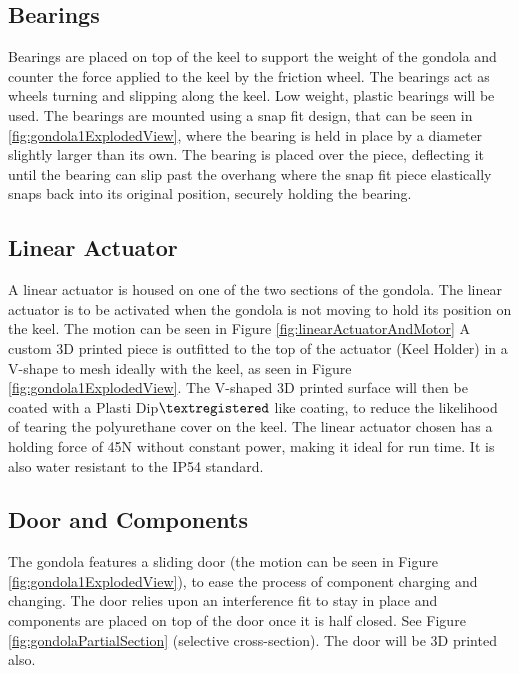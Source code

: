 \documentclass[../main.tex]{subfiles}
\begin{document}
\subsection{Bearings}
Bearings are placed on top of the keel to support the weight of the gondola and counter the force applied to the keel by the friction wheel. The bearings act as wheels turning and slipping along the keel. Low weight, plastic bearings will be used. The bearings are mounted using a snap fit design, that can be seen in \ref{fig:gondola1ExplodedView}, where the bearing is held in place by a diameter slightly larger than its own. The bearing is placed over the piece, deflecting it until the bearing can slip past the overhang where the snap fit piece elastically snaps back into its original position, securely holding the bearing.
\\
\subsection{Linear Actuator}
A linear actuator is housed on one of the two sections of the gondola. The linear actuator is to be activated when the gondola is not moving to hold its position on the keel. The motion can be seen in Figure \ref{fig:linearActuatorAndMotor} A custom 3D printed piece is outfitted to the top of the actuator (Keel Holder) in a V-shape to mesh ideally with the keel, as seen in Figure \ref{fig:gondola1ExplodedView}. The V-shaped 3D printed surface will then be coated with a Plasti Dip${\textregistered}$ like coating, to reduce the likelihood of tearing the polyurethane cover on the keel.  The  linear actuator chosen has a holding force of 45N without constant power, making it ideal for run time. It is also water resistant to the IP54 standard. 
\\
\subsection{Door and Components}
The gondola features a sliding door (the motion can be seen in Figure \ref{fig:gondola1ExplodedView}), to ease the process of component charging and changing. The door relies upon an interference fit to stay in place and components are placed on top of the door once it is half closed. See Figure \ref{fig:gondolaPartialSection} (selective cross-section). The door will be 3D printed also.
\\
\end{document}
